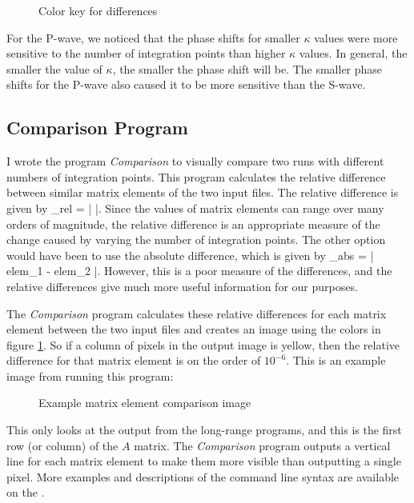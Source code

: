 \documentclass[Dissertation.tex]{subfiles}
\begin{document}
\begin{figure}[H]
	\caption{Color key for differences}
	\label{fig:ColorKey}
\end{figure}

For the P-wave, we noticed that the phase shifts for smaller $\kappa$ values were more sensitive to the number of integration points than higher $\kappa$ values. In general, the smaller the value of $\kappa$, the smaller the phase shift will be. The smaller phase shifts for the P-wave also caused it to be more sensitive than the S-wave.

\subsection{Comparison Program}
I wrote the program \emph{Comparison} \cite{} to visually compare two runs with different numbers of integration points. This program calculates the relative difference between similar matrix elements of the two input files. The relative difference is given by
\beq
{}_{rel} = \left|  \right|.
\eeq
Since the values of matrix elements can range over many orders of magnitude, the relative difference is an appropriate measure of the change caused by varying the number of integration points. The other option would have been to use the absolute difference, which is given by 
\beq
{}_{abs} = \left| elem_1 - elem_2 \right|.
\eeq
However, this is a poor measure of the differences, and the relative differences give much more useful information for our purposes.

The \emph{Comparison} program calculates these relative differences for each matrix element between the two input files and creates an image using the colors in figure \ref{fig:ColorKey}. So if a column of pixels in the output image is yellow, then the relative difference for that matrix element is on the order of $10^{-6}$. This is an example image from running this program:
\begin{figure}[H]
	\centering
	\caption{Example matrix element comparison image}
	\label{fig:QuadExample}
\end{figure}
This only looks at the output from the long-range programs, and this is the first row (or column) of the $A$ matrix. The \emph{Comparison} program outputs a vertical line for each matrix element to make them more visible than outputting a single pixel. More examples and descriptions of the command line syntax are available on the  \cite{Wiki}.
\end{document}
